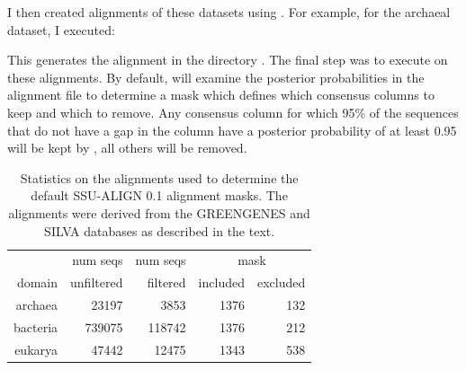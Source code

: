 I then created alignments of these datasets using
. For example, for the archaeal dataset, I executed: 


This generates the alignment  in the
directory .  The final step was to execute
 on these alignments. By default,  will
examine the posterior probabilities in the alignment file to determine
a mask which defines which consensus columns to keep and which to
remove. Any consensus column for which 95\% of the sequences that do
not have a gap in the column have a posterior probability of at least
0.95 will be kept by , all others will be removed. 

%
%
%
%
%
% 
% 
\begin{table}[hb]
\begin{center}
\begin{tabular}{r|rr|rr}
         & num seqs   & num seqs & \multicolumn{2}{c}{mask} \\ \cline{4-5}
domain   & unfiltered & filtered & included & excluded \\ \hline
archaea  & 23197      & 3853     & 1376     & 132 \\
bacteria & 739075     & 118742   & 1376     & 212 \\
eukarya  & 47442      & 12475    & 1343     & 538 \\ 
\end{tabular}
\caption{Statistics on the alignments used to determine the default
  SSU-ALIGN 0.1 alignment masks. The alignments were derived
  from the GREENGENES \cite{DeSantis06} and SILVA
  \cite{Pruesse07} databases as described in the text.}
\label{tbl:ggsil}
\end{center}
\end{table}

